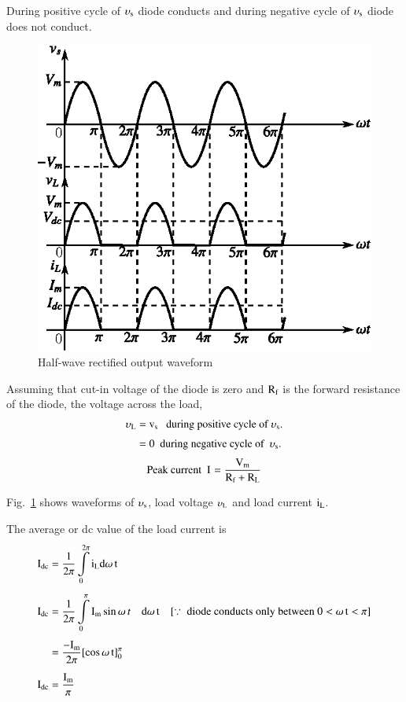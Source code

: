 During positive cycle of $\upsilon_{\textrm{s}}$ diode conducts and during negative cycle of $\upsilon_{\textrm{s}}$ diode does not conduct.
\begin{figure}[H]
\centering
\includegraphics[scale=1.15]{chap1/fig1.30.eps}
\caption{Half-wave rectified output waveform}\label{fig1.30}
\end{figure}

Assuming that cut-in voltage of the diode is zero and $\textrm{R}_{\textrm{f}}$ is the forward resistance of the diode, the voltage across the load,
\begin{align*}
\upsilon_{\textrm{L}} &= \textrm{v}_{\textrm{s}}\text{~~ during positive cycle of } \upsilon_{\textrm{s}}.\\[3pt]
         &= 0\text{~ during negative cycle of~ } \upsilon_{\textrm{s}}.
\end{align*}
\begin{equation}
\text{Peak current~~} \textrm{I}_{\rm}=\frac{\textrm{V}_{\textrm{m}}}{\textrm{R}_{\textrm{f}}+\textrm{R}_{\textrm{L}}}\label{eq1.9}
\end{equation}

Fig.~\ref{fig1.30} shows waveforms of $\upsilon_{\textrm{s}}$, load voltage $\upsilon_{\textrm{L}}$ and load current $\textrm{i}_{\textrm{L}}$.

\eject

The average or dc value of the load current is
\begin{align}
\textrm{I}_{\textrm{d}\textrm{c}} &= \frac{1}{2\pi}\int\limits^{2\pi}_{0}\textrm{i}_{\textrm{L}} \textrm{d} \omega\, \textrm{t}\notag\\[4pt]
\textrm{I}_{\textrm{d}\textrm{c}} &= \frac{1}{2\pi}\int\limits^{\pi}_{0}\textrm{I}_{\textrm{m}}\sin \omega\, t\quad \textrm{d}\omega\, \textrm{t}\quad [\because~ \text{diode conducts only between } 0<\omega\, \textrm{t}<\pi]\notag\\[4pt]
&= \frac{-\textrm{I}_{\textrm{m}}}{2\pi}[\cos\omega\, \textrm{t}]^{\pi}_{0}\notag\\[5pt]
\textrm{I}_{\textrm{d}\textrm{c}} &= \frac{\textrm{I}_{\textrm{m}}}{\pi}\label{eq1.10}
\end{align}

